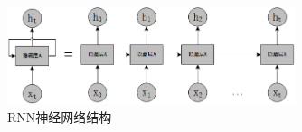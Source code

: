 


\begin{figure}[hbt]
	\centering
	\includegraphics[width=0.75\textwidth]{figures/2.4}
	\caption{RNN神经网络结构}\label{fig:2.4}
\end{figure}



